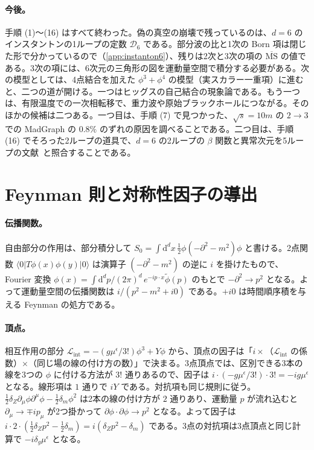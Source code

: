 \documentclass[a4paper,10pt]{ltjsarticle}
\newcommand{\dd}{\mathrm{d}}
\begin{document}
\paragraph{今後。}手順 (1)〜(16) はすべて終わった。偽の真空の崩壊で残っているのは、$d=6$ のインスタントンの1ループの定数 $\mathcal D_6$ である。部分波の比と1次の Born 項は閉じた形で分かっているので（\ref{app:instanton6}）、残りは2次と3次の項の $\overline{\mathrm{MS}}$ の値である。3次の項には、6次元の三角形の図を運動量空間で積分する必要がある。次の模型としては、4点結合を加えた $\phi^3+\phi^4$ の模型（実スカラー一重項）に進むと、二つの道が開ける。一つはヒッグスの自己結合の現象論である。もう一つは、有限温度での一次相転移で、重力波や原始ブラックホールにつながる。そのほかの候補は二つある。一つ目は、手順 (7) で見つかった、$\sqrt s=10m$ の $2\to3$ での MadGraph の $0.8\%$ のずれの原因を調べることである。二つ目は、手順 (16) でそろった2ループの道具で、$d=6$ の2ループの $\beta$ 関数と異常次元を5ループの文献~\cite{bgks}と照合することである。

\appendix

\section{Feynman 則と対称性因子の導出}\label{app:rules}

\paragraph{伝播関数。}自由部分の作用は、部分積分して $S_0=\int\dd^dx\,\tfrac12\phi(-\partial^2-m^2)\phi$ と書ける。2点関数 $\langle0|T\phi(x)\phi(y)|0\rangle$ は演算子 $(-\partial^2-m^2)$ の逆に $i$ を掛けたもので、Fourier 変換 $\phi(x)=\int\dd^dp/(2\pi)^d\,e^{-ip\cdot x}\tilde\phi(p)$ のもとで $-\partial^2\to p^2$ となる。よって運動量空間の伝播関数は $i/(p^2-m^2+i0)$ である。$+i0$ は時間順序積を与える Feynman の処方である。

\paragraph{頂点。}相互作用の部分 $\mathcal{L}_{\text{int}}=-(g\mu^\epsilon/3!)\phi^3+Y\phi$ から、頂点の因子は「$i\times$（$\mathcal{L}_{\text{int}}$ の係数）$\times$（同じ場の線の付け方の数）」で決まる。3点頂点では、区別できる3本の線を3つの $\phi$ に付ける方法が $3!$ 通りあるので、因子は $i\cdot(-g\mu^\epsilon/3!)\cdot3!=-ig\mu^\epsilon$ となる。線形項は $1$ 通りで $iY$ である。対抗項も同じ規則に従う。$\tfrac12\delta_Z\partial_\mu\phi\partial^\mu\phi-\tfrac12\delta_m\phi^2$ は2本の線の付け方が $2$ 通りあり、運動量 $p$ が流れ込むと $\partial_\mu\to\mp ip_\mu$ が2つ掛かって $\partial\phi\cdot\partial\phi\to p^2$ となる。よって因子は $i\cdot2\cdot(\tfrac12\delta_Zp^2-\tfrac12\delta_m)=i(\delta_Zp^2-\delta_m)$ である。3点の対抗項は3点頂点と同じ計算で $-i\delta_g\mu^\epsilon$ となる。
\end{document}
